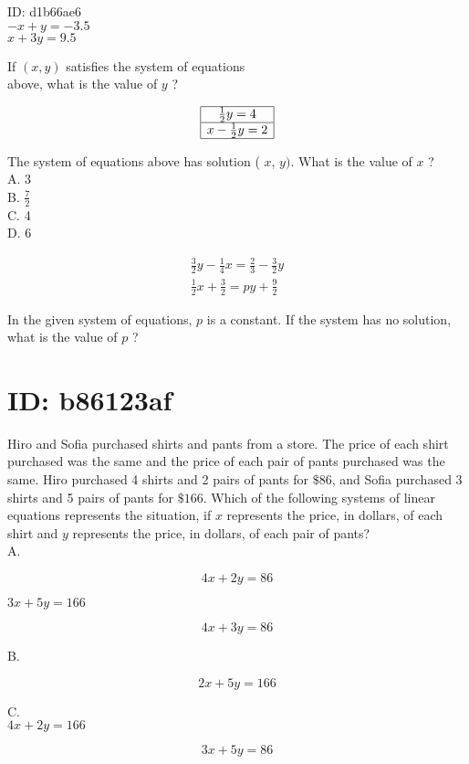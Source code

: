 

ID: d1b66ae6\\
$-x+y=-3.5$\\
$x+3 y=9.5$

If $(x, y)$ satisfies the system of equations\\
above, what is the value of $y$ ?

$$
\begin{array}{|c|}
\hline \frac{1}{2} y=4 \\
\hline x-\frac{1}{2} y=2 \\
\hline
\end{array}
$$

The system of equations above has solution ( $x$, $y)$. What is the value of $x$ ?\\
A. 3\\
B. $\frac{7}{2}$\\
C. 4\\
D. 6

$$
\begin{gathered}
\frac{3}{2} y-\frac{1}{4} x=\frac{2}{3}-\frac{3}{2} y \\
\frac{1}{2} x+\frac{3}{2}=p y+\frac{9}{2}
\end{gathered}
$$

In the given system of equations, $p$ is a constant. If the system has no solution, what is the value of $p$ ?

\section*{ID: b86123af}
Hiro and Sofia purchased shirts and pants from a store. The price of each shirt purchased was the same and the price of each pair of pants purchased was the same. Hiro purchased 4 shirts and 2 pairs of pants for $\$ 86$, and Sofia purchased 3 shirts and 5 pairs of pants for $\$ 166$. Which of the following systems of linear equations represents the situation, if $x$ represents the price, in dollars, of each shirt and $y$ represents the price, in dollars, of each pair of pants?\\
A.

$$
4 x+2 y=86
$$

$3 x+5 y=166$

$$
4 x+3 y=86
$$

B.

$$
2 x+5 y=166
$$

C.\\
$4 x+2 y=166$

$$
3 x+5 y=86
$$

